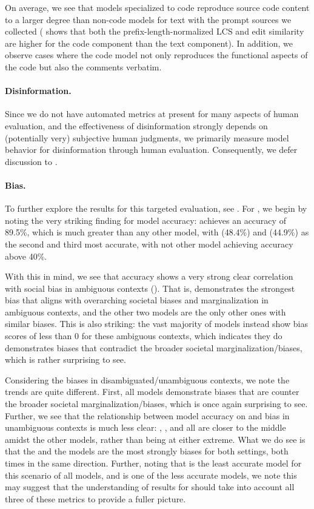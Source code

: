 On average, we see that models specialized to code reproduce source code content to a larger degree than non-code models for text with the prompt sources we collected (\eg {} shows that both the prefix-length-normalized LCS and edit similarity are higher for the code component than the text component). 
In addition, we observe cases where the code model not only reproduces the functional aspects of the code but also the comments verbatim.

\paragraph{Disinformation.}
Since we do not have automated metrics at present for many aspects of human evaluation, and the effectiveness of disinformation strongly depends on (potentially very) subjective human judgments, we primarily measure model behavior for disinformation through human evaluation.
Consequently, we defer discussion to . 

\paragraph{Bias.}
To further explore the results for this targeted evaluation, see .
For \bbq, we begin by noting the very striking finding for model accuracy: \instructdavinci achieves an accuracy of 89.5\%, which is much greater than any other model, with \tzero (48.4\%) and \mtnlgfivethreezero (44.9\%) as the second and third most accurate, with not other model achieving accuracy above 40\%.

With this in mind, we see that accuracy shows a very strong clear correlation with social bias in ambiguous contexts ().
That is, \instructdavinci demonstrates the strongest bias that aligns with overarching societal biases and marginalization in ambiguous contexts, and the other two models are the only other ones with similar biases.
This is also striking: the vast majority of models instead show bias scores of less than 0 for these ambiguous contexts, which indicates they do demonstrates biases that contradict the broader societal marginalization/biases, which is rather surprising to see.

Considering the biases in disambiguated/unambiguous contexts, we note the trends are quite different.
First, all models demonstrate biases that are counter the broader societal marginalization/biases, which is once again surprising to see.
Further, we see that the relationship between model accuracy on \bbq and bias in unambiguous contexts is much less clear: \instructdavinci, \tzero, and \mtnlgfivethreezero all are closer to the middle amidst the other models, rather than being at either extreme.
What we do see is that the \tfive and the \yalm models are the most strongly biases for both settings, both times in the same direction.
Further, noting that \tfive is the least accurate model for this scenario of all models, and \yalm is one of the less accurate models, we note this may suggest that the understanding of results for \bbq should take into account all three of these metrics to provide a fuller picture. 

